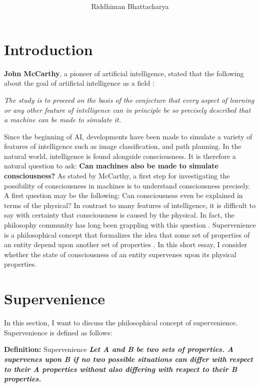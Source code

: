 \documentclass{article}
\title{\textbf{\color{blue}{Is Consciousness Supervenient on the Physical?}}}
\author{Riddhiman Bhattacharya}
\affil{Visvabharati University, Santiniketan}
\date{}
\begin{document}
\maketitle


\section*{Introduction}

\textbf{John McCarthy}, a pioneer of artificial intelligence, stated that the following about the goal of artificial intelligence as a field \cite{mccarthy2006dartmouth}:

\textit{The study is to proceed on the  basis of the conjecture that every aspect of learning  or any other feature of intelligence can in principle be so precisely described that a machine can be made to simulate it.}

Since the beginning of AI, developments have been made to simulate a variety of features of intelligence such as image classification, and path planning. In the natural world, intelligence is found alongside consciousness. It is therefore a natural question to ask:\textbf{ Can machines also be made to simulate consciousness?}
As stated by McCarthy, a first step for investigating the possibility of consciousness in machines is to understand consciousness precisely. A first question may be the following: Can consciousness even be explained in terms of the physical? In contrast to many features of intelligence, it is difficult to say with certainty that consciousness is caused by the physical.  In fact, the philosophy community has long been grappling with this question \cite{chalmers1995facing,chalmers1996conscious, kim1993supervenience, mclaughlin2018supervenience}. Supervenience is a philosophical concept that formalizes the idea that some set of properties of an entity depend upon another set of properties \cite{kim1993supervenience}. In this short essay, I consider whether the state of consciousness of an entity supervenes upon its physical properties.


\section*{Supervenience}
In this section, I want to discuss the philosophical concept of supervenience. Supervenience is defined as follows:

\textbf{Definition:} Supervenience \textit{\textbf{Let A and B be two sets of properties. A supervenes upon B if no two possible situations can differ with respect to their A properties without also differing with respect to their B properties.}} \cite{chalmers1996conscious} 
\end{document}
